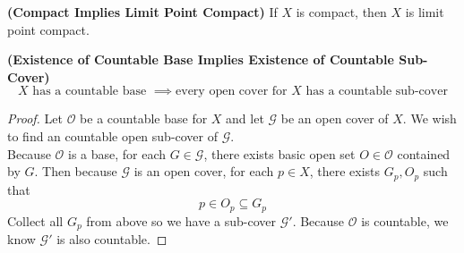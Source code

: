 \documentclass{report}
\begin{document}
\begin{corollary}
\label{2.6.12}
\textbf{(Compact Implies Limit Point Compact)} If $X$ is compact, then $X$ is limit point compact.
\end{corollary}
\begin{theorem}
\label{2.6.13}
\textbf{(Existence of Countable Base Implies Existence of Countable Sub-Cover)} 
\begin{equation}
X\text{ has a countable base }\implies\text{every open cover for $X$ has a countable sub-cover}
\end{equation}
\end{theorem}
\begin{proof}
Let $\mathcal{O}$ be a countable base for $X$ and let $\mathcal{G}$ be an open cover of $X$. We wish to find an countable open sub-cover of $\mathcal{G}$.\\

Because $\mathcal{O}$ is a base, for each $G\in \mathcal{G}$, there exists basic open set $O\in \mathcal{O}$ contained by $G$. Then because  $\mathcal{G}$ is an open cover, for each $p\in X$, there exists $G_p,O_p$ such that
\begin{equation}
p\in O_p\subseteq G_p
\end{equation}
Collect all $G_p$ from above so we have a sub-cover $\mathcal{G}'$. Because $\mathcal{O}$ is countable, we know $\mathcal{G}'$ is also countable.
\end{proof}
\end{document}
